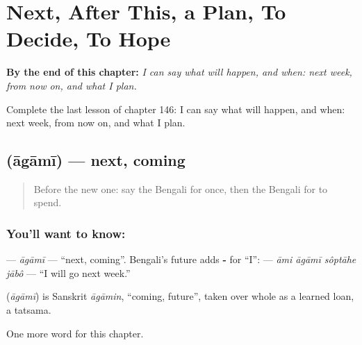 
\chapter{Next, After This, a Plan, To Decide, To Hope}
\label{ch:bn-next-after-this-a-plan-to-decide-to-hope}

\begin{chapteropening}
\textbf{By the end of this chapter:} \emph{I can say what will happen, and when: next week, from now on, and what I plan.}

Complete the last lesson of chapter 146: I can say what will happen, and when: next week, from now on, and what I plan.
\end{chapteropening}

\section[\texorpdfstring{\bn{আগামী} (āgāmī)}{আগামী (āgāmī)}]{ (āgāmī) — next, coming}

\label{lesson:BN-C146-agami}



\begin{quote}
Before the new one: say the Bengali for once, then the Bengali for to spend.
\end{quote}

\subsection*{You'll want to know: }
\textbf{} — \emph{āgāmī} — \textquotedblleft{}next, coming\textquotedblright{}. Bengali's future adds \textbf{-} for \textquotedblleft{}I\textquotedblright{}: \textbf{   } — \emph{āmi āgāmī sôptāhe jābô} — \textquotedblleft{}I will go next week.\textquotedblright{}

\begin{cousinweb}
\textbf{} (\emph{āgāmī}) is Sanskrit \emph{āgāmin}, \textquotedblleft{}coming, future\textquotedblright{}, taken over whole as a learned loan, a tatsama.
\end{cousinweb}

\begin{grammarlens}[title={What you've built}]
One more word for this chapter.
\end{grammarlens}

